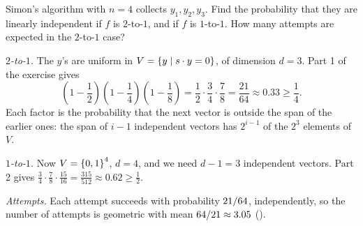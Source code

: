 \begin{exercisebox}
\begin{pproblem}[Independence for $n = 4$]\label{wp:indep4}
    Simon's algorithm with $n = 4$ collects $y_1, y_2, y_3$. Find the probability that they are
    linearly independent if $f$ is $2$-to-$1$, and if $f$ is $1$-to-$1$. How many attempts are
    expected in the $2$-to-$1$ case?
\end{pproblem}
\tcblower
\begin{wsolution}
    \emph{$2$-to-$1$.} The $y$'s are uniform in $V = \left\lbrace y \mid s \cdot y = 0\right\rbrace$, of dimension
    $d = 3$. Part 1 of the exercise gives
    \[\left(1 - \frac{1}{2}\right)\left(1 - \frac{1}{4}\right)\left(1 - \frac{1}{8}\right)
        = \frac{1}{2} \cdot \frac{3}{4} \cdot \frac{7}{8} = \frac{21}{64} \approx 0.33 \geq \frac{1}{4}.\]
    Each factor is the probability that the next vector is outside the span of the earlier ones:
    the span of $i - 1$ independent vectors has $2^{i-1}$ of the $2^3$ elements of $V$.

    \emph{$1$-to-$1$.} Now $V = \left\lbrace0,1\right\rbrace^4$, $d = 4$, and we need $d - 1 = 3$ independent
    vectors. Part 2 gives
    $\frac{3}{4} \cdot \frac{7}{8} \cdot \frac{15}{16} = \frac{315}{512} \approx 0.62 \geq \frac{1}{2}$.

    \emph{Attempts.} Each attempt succeeds with probability $21/64$, independently, so the
    number of attempts is geometric with mean $64/21 \approx 3.05$ ().
\end{wsolution}
\end{exercisebox}

